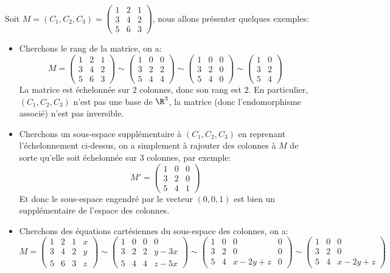 Soit \(M = (C_1, C_2, C_3) = \begin{pmatrix} 1 & 2 & 1\\ 3 & 4 & 2\\ 5 & 6 & 3\end{pmatrix}\), nous allons présenter quelques exemples:
\begin{itemize}
   \item Cherchons le rang de la matrice, on a:
   \[
      M = \begin{pmatrix} 1 & 2 & 1\\ 3 & 4 & 2\\ 5 & 6 & 3\end{pmatrix} \sim  \begin{pmatrix} 1 & 0 & 0\\ 3 & 2 & 2\\ 5 & 4 & 4\end{pmatrix} \sim  \begin{pmatrix} 1 & 0 & 0\\ 3 & 2 & 0\\ 5 & 4 & 0\end{pmatrix} \sim  \begin{pmatrix} 1 & 0\\ 3 & 2\\ 5 & 4\end{pmatrix}
   \]
   La matrice est échelonnée sur \(2\) colonnes, donc son rang est \(2\). En particulier, \((C_1, C_2, C_3)\) n'est pas une base de \(\R^3\), la matrice (donc l'endomorphisme associé) n'est pas inversible.
   \item Cherchons un sous-espace supplémentaire à \((C_1, C_2, C_3)\) en reprenant l'échelonnement ci-dessus, on a simplement à rajouter des colonnes à \(M\) de sorte qu'elle soit échelonnée sur 3 colonnes, par exemple:
   \[
      M' = \begin{pmatrix} 1 & 0 & 0\\ 3 & 2 & 0\\ 5 & 4 & 1\end{pmatrix}
   \]
   Et donc le sous-espace engendré par le vecteur \((0, 0, 1)\) est bien un supplémentaire de l'espace des colonnes.
   \item Cherchons des équations cartésiennes du sous-espace des colonnes, on a:
   \[
      M = \begin{pmatrix} 1 & 2 & 1 & x\\ 3 & 4 & 2 & y\\ 5 & 6 & 3 &z\end{pmatrix} \sim  \begin{pmatrix} 1 & 0 & 0 & 0\\ 3 & 2 & 2 & y-3x\\ 5 & 4 & 4 & z-5x\end{pmatrix} \sim  \begin{pmatrix} 1 & 0 & 0 & 0\\ 3 & 2 & 0 & 0\\ 5 & 4 & x - 2y + z & 0\end{pmatrix}\sim  \begin{pmatrix} 1 & 0 & 0\\ 3 & 2 & 0\\ 5 & 4 & x - 2y + z\end{pmatrix}
\]
\end{itemize}
